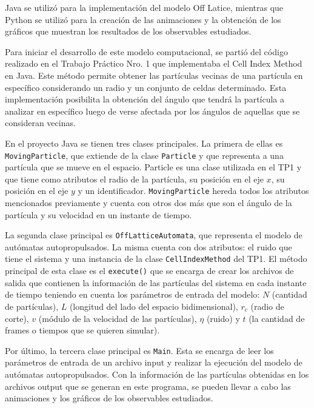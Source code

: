 \documentclass[11pt]{article}
\begin{document}
    Java se utilizó para la implementación del modelo Off Latice, mientras que Python se utilizó para la creación de las
    animaciones y la obtención de los gráficos que muestran los resultados de los observables estudiados.

    Para iniciar el desarrollo de este modelo computacional, se partió del código realizado en el Trabajo Práctico Nro. 1 que
    implementaba el Cell Index Method en Java. Este método permite obtener las partículas vecinas de una partícula en específico
    considerando un radio y un conjunto de celdas determinado. Esta implementación posibilita la obtención del ángulo que tendrá
    la partícula a analizar en específico luego de verse afectada por los ángulos de aquellas que se consideran vecinas.

    En el proyecto Java se tienen tres clases principales. La primera de ellas es \texttt{MovingParticle}, que extiende de
    la clase \texttt{Particle} y que representa a una partícula que se mueve en el espacio. Particle es una clase utilizada en el
    TP1 y que tiene como atributos el radio de la partícula, su posición en el eje $x$, su posición en el eje $y$ y un
    identificador. \texttt{MovingParticle} hereda todos los atributos mencionados previamente y cuenta con otros dos más que son
    el ángulo de la partícula y su velocidad en un instante de tiempo.

    La segunda clase principal es \texttt{OffLatticeAutomata}, que representa el modelo de autómatas autopropulsados. La misma cuenta
    con dos atributos: el ruido que tiene el sistema y una instancia de la clase \texttt{CellIndexMethod} del TP1. El método principal de esta clase
    es el \texttt{execute()} que se encarga de crear los archivos de salida que contienen la información de las partículas del sistema
    en cada instante de tiempo teniendo en cuenta los parámetros de entrada del modelo: $N$ (cantidad de partículas), $L$ (longitud
    del lado del espacio bidimensional), $r_c$ (radio de corte), $v$ (módulo de la velocidad de las partículas), $\eta$ (ruido) y
    $t$ (la cantidad de frames o tiempos que se quieren simular).

    Por último, la tercera clase principal es \texttt{Main}. Esta se encarga de leer los parámetros de entrada de un archivo input y
    realizar la ejecución del modelo de autómatas autopropulsados. Con la información de las partículas obtenidas en los archivos
    output que se generan en este programa, se pueden llevar a cabo las animaciones y los gráficos de los observables estudiados.
\end{document}
